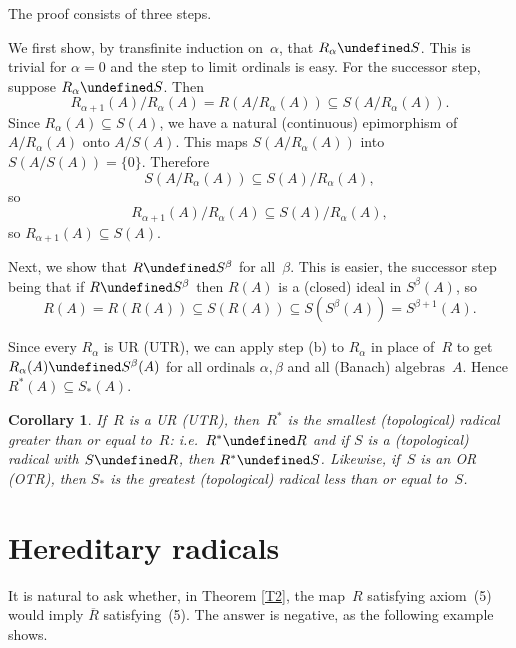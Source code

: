 \documentclass[11pt]{article}
\newcounter{alenum}
\newenvironment{alenumerate}{\begin{list}{(\alph{alenum})}%
{\usecounter{alenum}}}{\end{list}}
\newcommand{\ie}{i.e.\ }
\newcommand{\sseq}{\subseteq}
\let\leq\undefined  \let\geq\undefined
\let\le\leq   \let\ge\geq
\newcommand{\al}{\alpha}
\newcommand{\bt}{\beta}
\newtheorem{cor}[thm]{Corollary}
\newenvironment{Proof}{{\it Proof. }}{}%
\newcommand{\Rbar}{\overline{R}}
\newcommand{\Rstar}{R^*}
\begin{document}
\begin{Proof}
The proof consists of three steps.
\begin{alenumerate}
\item
We first show, by transfinite induction on~$\al$, that $R_\al \le S$.   This
is trivial for $\al=0$ and the step to limit ordinals is easy.   For the
successor step, suppose $R_\al \le S$. Then
$$R_{\al+1}(A)/R_\al(A) = R\left(A/R_\al(A)\right) \sseq S\left(A/R_\al(A)\right).$$
Since $R_\al(A) \sseq S(A)$, we have a natural (continuous) epimorphism of
$A/R_\al(A)$ onto $A/S(A)$.   This maps $S\left(A/R_\al(A)\right)$ into
$S\left(A/S(A)\right) = \{0\}$.  Therefore
$$S\left(A/R_\al(A)\right) \sseq S(A)/R_\al(A),$$
so
$$R_{\al+1}(A)/R_\al(A) \sseq S(A)/R_\al(A),$$
so $R_{\al+1}(A)\sseq S(A)$.
\item
Next, we show that $R \le S^\bt$ for all~$\bt$.   This is easier, the
successor step being that if $R \le S^\bt$ then $R(A)$ is a (closed) ideal
in $S^\bt(A)$, so
$$R(A) = R(R(A)) \sseq S(R(A)) \sseq S(S^\bt(A)) = S^{\bt+1}(A).$$
\item
Since every $R_\al$ is UR (UTR), we can apply step (b)
to $R_\al$ in place of~$R$ to get $R_\al(A) \le S^\bt(A)$ for all ordinals
$\al,\bt$ and all (Banach) algebras~$A$.  Hence $\Rstar(A) \sseq S_*(A)$.
\end{alenumerate}
\end{Proof}

\begin{cor}\label{C4.1}
If~$R$ is a UR (UTR), then~$\Rstar$ is the smallest (topological) radical greater
than or equal to~$R$: \ie $\Rstar \ge R$ and if $S$ is a (topological) radical
with $S \ge R$, then $\Rstar \le S$.    Likewise, if~$S$ is an OR (OTR), then
$S_*$ is the greatest (topological) radical less than or equal to~$S$.
\end{cor}
\section{Hereditary radicals}\label{S5a}

It is natural to ask whether, in Theorem \ref{T2}, the map~$R$ satisfying
axiom~(5) would imply $\Rbar$ satisfying~(5).    The answer is negative,
as the following example shows.
\end{document}

